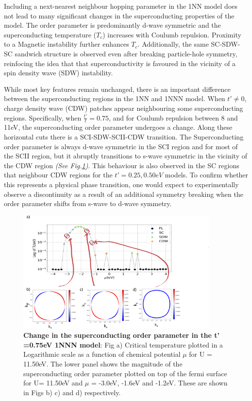\documentclass[12pt]{article}
\begin{document}
Including a next-nearest neighbour hopping parameter in the 1NN model does not lead to
many significant changes in the superconducting properties of the model. The order parameter is predominantly d-wave symmetric and the  superconducting temperature ($T_c$) increases
with Coulumb repulsion. Proximity to a Magnetic instability further enhances $T_c$.
Additionally, the same SC-SDW-SC sandwich structure is observed even after breaking particle-hole symmetry, reinfocing the 
idea that that superconductivity is favoured in the vicinity of a  spin density wave (SDW) instability. \par
\medskip
\noindent While most key features remain unchanged, there is an important difference between the superconducting regions in the 1NN and 1NNN model. 
When $t' \neq 0 $, charge density wave (CDW) patches appear neighbouring some superconducting regions.
Specifically, when $\frac{t'}{t} = 0.75$, and for Coulumb repulsion between 8 and 11eV, the superconducting order parameter undergoes a change.
Along these horizontal cuts there is a SCI-SDW-SCII-CDW transition. The Superconducting order parameter 
is always d-wave symmetric in the SCI region and for most of the SCII region, but it abruptly transitions to 
s-wave symmetric in the vicinity of the CDW region \textit{(See Fig.\ref{fig:1NNNSC})}. This behaviour is also observed in the SC regions that neighbour CDW regions for 
the $t' = 0.25, 0.50eV$ models. To confirm whether this represents a physical phase transition, one would expect to experimentally observe a 
discontinuity as a result of an additional symmetry breaking when the order parameter shifts from s-wave to d-wave symmetry.

\begin{figure}[htbp]  %
    \centering
    \includegraphics[width=0.90\textwidth]{1NNNSC_075.png}  %
    \caption{\textbf{Change in the superconducting order parameter in the t' =0.75eV 1NNN model}: Fig a) Critical temperature plotted in a Logarithmic scale
    as a function of chemical potential $\mu$ for U = 11.50eV.
    The lower panel shows the magnitude of the superconducting order parameter plotted on top of the fermi surface for U= 11.50eV and $\mu$ = -3.0eV, -1.6eV and -1.2eV. These are shown in Figs b)
    c) and d) respectively.  }
    \label{fig:1NNNSC}
\end{figure}
\end{document}
